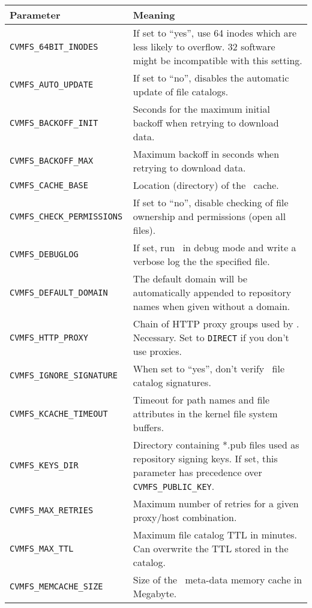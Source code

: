 	\begin{longtable}{lX}
		\toprule
		{\bf\centering Parameter} 			& {\bf\centering Meaning}\\
		\midrule
		\tt CVMFS\_64BIT\_INODES			& If set to ``yes'', use \SI{64}{\bit} inodes which are less likely to overflow. \SI{32}{\bit} software might be incompatible with this setting.\\
		\tt CVMFS\_AUTO\_UPDATE			& If set to ``no'', disables the automatic update of file catalogs.\\
		\tt CVMFS\_BACKOFF\_INIT			& Seconds for the maximum initial backoff when retrying to download data.\\ 
		\tt CVMFS\_BACKOFF\_MAX			& Maximum backoff in seconds when retrying to download data.\\
		\tt CVMFS\_CACHE\_BASE				& Location (directory) of the \cvmfs\ cache.\\
		\tt CVMFS\_CHECK\_PERMISSIONS		& If set to ``no'', disable checking of file ownership and permissions (open all files).\\
		\tt CVMFS\_DEBUGLOG				& If set, run \cvmfs\ in debug mode and write a verbose log the the specified file.\\
		\tt CVMFS\_DEFAULT\_DOMAIN			& The default domain will be automatically appended to repository names when given without a domain.\\
		\tt CVMFS\_HTTP\_PROXY				& Chain of HTTP proxy groups used by \cvmfs. Necessary. Set to \texttt{DIRECT} if you don't use proxies.\\
		\tt CVMFS\_IGNORE\_SIGNATURE		& When set to ``yes'', don't verify \cvmfs\ file catalog signatures.\\
		\tt CVMFS\_KCACHE\_TIMEOUT			& Timeout for path names and file attributes in the kernel file system buffers.\\
		\tt CVMFS\_KEYS\_DIR				& Directory containing *.pub files used as repository signing keys.  If set, this parameter has precedence over \texttt{CVMFS\_PUBLIC\_KEY}.\\
		\tt CVMFS\_MAX\_RETRIES			& Maximum number of retries for a given proxy/host combination.\\
		\tt CVMFS\_MAX\_TTL				& Maximum file catalog TTL in minutes.  Can overwrite the TTL stored in the catalog.\\
		\tt CVMFS\_MEMCACHE\_SIZE			& Size of the \cvmfs\ meta-data memory cache in Megabyte.\\

\end{longtable}
